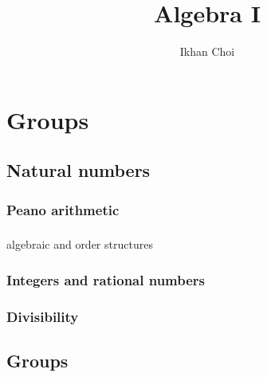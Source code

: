 \documentclass{../../large}
\begin{document}
\title{Algebra I}
\author{Ikhan Choi}
\maketitle
\tableofcontents

\part{Groups}
\chapter{Natural numbers}

\section{Peano arithmetic}




\section{}

\begin{prb}

\end{prb}

algebraic and order structures


\section{Integers and rational numbers}


\section{Divisibility}












\chapter{Groups}
\end{document}
